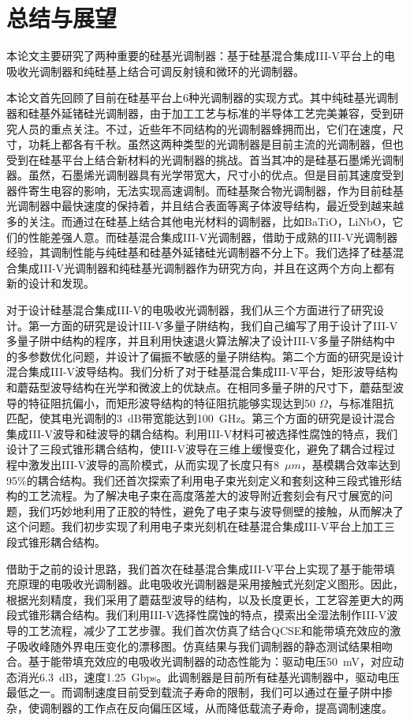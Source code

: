 \chapter{总结与展望}
本论文主要研究了两种重要的硅基光调制器：基于硅基混合集成III-V平台上的电吸收光调制器和纯硅基上结合可调反射镜和微环的光调制器。

本论文首先回顾了目前在硅基平台上6种光调制器的实现方式。其中纯硅基光调制器和硅基外延锗硅光调制器，由于加工工艺与标准的半导体工艺完美兼容，受到研究人员的重点关注。不过，近些年不同结构的光调制器蜂拥而出，它们在速度，尺寸，功耗上都各有千秋。虽然这两种类型的光调制器是目前主流的光调制器，但也受到在硅基平台上结合新材料的光调制器的挑战。首当其冲的是硅基石墨烯光调制器。虽然，石墨烯光调制器具有光学带宽大，尺寸小的优点。但是目前其速度受到器件寄生电容的影响，无法实现高速调制。而硅基聚合物光调制器，作为目前硅基光调制器中最快速度的保持着，并且结合表面等离子体波导结构，最近受到越来越多的关注。而通过在硅基上结合其他电光材料的调制器，比如BaTiO，LiNbO，它们的性能差强人意。而硅基混合集成III-V光调制器，借助于成熟的III-V光调制器经验，其调制性能与纯硅基和硅基外延锗硅光调制器不分上下。我们选择了硅基混合集成III-V光调制器和纯硅基光调制器作为研究方向，并且在这两个方向上都有新的设计和发现。

对于设计硅基混合集成III-V的电吸收光调制器，我们从三个方面进行了研究设计。第一方面的研究是设计III-V多量子阱结构，我们自己编写了用于设计了III-V多量子阱中结构的程序，并且利用快速退火算法解决了设计III-V多量子阱结构中的多参数优化问题，并设计了偏振不敏感的量子阱结构。第二个方面的研究是设计混合集成III-V波导结构。我们分析了对于硅基混合集成III-V平台，矩形波导结构和蘑菇型波导结构在光学和微波上的优缺点。在相同多量子阱的尺寸下，蘑菇型波导的特征阻抗偏小，而矩形波导结构的特征阻抗能够实现达到50 $\Omega$，与标准阻抗匹配，使其电光调制的3~dB带宽能达到100~GHz。第三个方面的研究是设计混合集成III-V波导和硅波导的耦合结构。利用III-V材料可被选择性腐蚀的特点，我们设计了三段式锥形耦合结构，使III-V波导在三维上缓慢变化，避免了耦合过程过程中激发出III-V波导的高阶模式，从而实现了长度只有8~$\mu m$，基模耦合效率达到95\%的耦合结构。我们还首次探索了利用电子束光刻定义和套刻这种三段式锥形结构的工艺流程。为了解决电子束在高度落差大的波导附近套刻会有尺寸展宽的问题，我们巧妙地利用了正胶的特性，避免了电子束与波导侧壁的接触，从而解决了这个问题。我们初步实现了利用电子束光刻机在硅基混合集成III-V平台上加工三段式锥形耦合结构。

借助于之前的设计思路，我们首次在硅基混合集成III-V平台上实现了基于能带填充原理的电吸收光调制器。此电吸收光调制器是采用接触式光刻定义图形。因此，根据光刻精度，我们采用了蘑菇型波导的结构，以及长度更长，工艺容差更大的两段式锥形耦合结构。我们利用III-V选择性腐蚀的特点，摸索出全湿法制作III-V波导的工艺流程，减少了工艺步骤。我们首次仿真了结合QCSE和能带填充效应的激子吸收峰随外界电压变化的漂移图。仿真结果与我们调制器的静态测试结果相吻合。基于能带填充效应的电吸收光调制器的动态性能为：驱动电压50~mV，对应动态消光6.3~dB，速度1.25~Gbps。此调制器是目前所有硅基光调制器中，驱动电压最低之一。而调制速度目前受到载流子寿命的限制，我们可以通过在量子阱中掺杂，使调制器的工作点在反向偏压区域，从而降低载流子寿命，提高调制速度。

